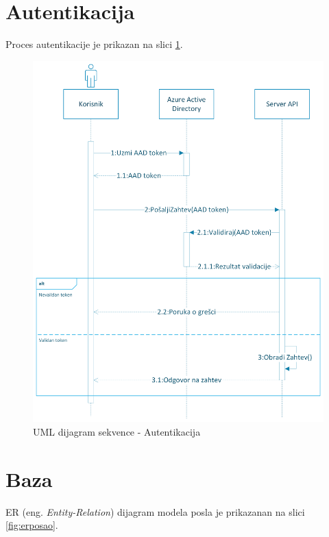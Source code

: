 \documentclass[12pt,oneside]{memoir}
\begin{document}
\section{Autentikacija}

Proces autentikacije je prikazan na slici \ref{fig:autentikacija}.

\begin{figure}[!ht]
  \centering
  \label{fig:autentikacija}
  \includegraphics[width=1.0\textwidth]{./images/autentikacija_uml_dijagram_sekvence.png}
  \caption{UML dijagram sekvence - Autentikacija}
\end{figure}


\section{Baza}

ER (eng. \emph{Entity-Relation}) dijagram modela posla je prikazanan na slici \ref{fig:erposao}.
\end{document}

